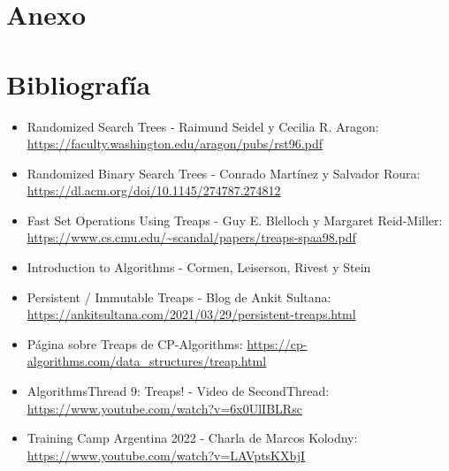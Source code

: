 \documentclass{article}
\def\versionanexo{anexo-codigo}
\begin{document}
\maketitle
\tableofcontents
\newpage

\begin{multicols*}{2}

















\end{multicols*}

\newpage
\appendix

\section{Anexo}



\section{Bibliografía}

\begin{itemize}
\item Randomized Search Trees - Raimund Seidel y Cecilia R. Aragon: \url{https://faculty.washington.edu/aragon/pubs/rst96.pdf}
\item Randomized Binary Search Trees - Conrado Martínez y Salvador Roura: \url{https://dl.acm.org/doi/10.1145/274787.274812}
\item Fast Set Operations Using Treaps - Guy E. Blelloch y Margaret Reid-Miller: \url{https://www.cs.cmu.edu/~scandal/papers/treaps-spaa98.pdf}
\item Introduction to Algorithms - Cormen, Leiserson, Rivest y Stein
\item Persistent / Immutable Treaps - Blog de Ankit Sultana: \url{https://ankitsultana.com/2021/03/29/persistent-treaps.html}
\item Página sobre Treaps de CP-Algorithms: \url{https://cp-algorithms.com/data_structures/treap.html}
\item AlgorithmsThread 9: Treaps! - Video de SecondThread: 
\url{https://www.youtube.com/watch?v=6x0UlIBLRsc}
\item Training Camp Argentina 2022 - Charla de Marcos Kolodny: \url{https://www.youtube.com/watch?v=LAVptsKXbjI}
\end{itemize}
\end{document}
